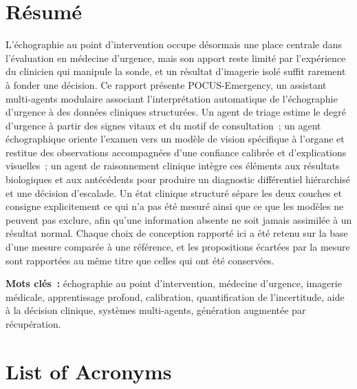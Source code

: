 \documentclass[11pt, a4paper]{article}
\begin{document}
\begin{sloppypar}
\section*{Résumé}
\noindent
L'échographie au point d'intervention occupe désormais une place centrale dans
l'évaluation en médecine d'urgence, mais son apport reste limité par l'expérience du
clinicien qui manipule la sonde, et un résultat d'imagerie isolé suffit rarement à fonder
une décision. Ce rapport présente POCUS-Emergency, un assistant multi-agents modulaire
associant l'interprétation automatique de l'échographie d'urgence à des données cliniques
structurées. Un agent de triage estime le degré d'urgence à partir des signes vitaux et du
motif de consultation~; un agent échographique oriente l'examen vers un modèle de vision
spécifique à l'organe et restitue des observations accompagnées d'une confiance calibrée
et d'explications visuelles~; un agent de raisonnement clinique intègre ces éléments aux
résultats biologiques et aux antécédents pour produire un diagnostic différentiel
hiérarchisé et une décision d'escalade. Un état clinique structuré sépare les deux couches
et consigne explicitement ce qui n'a pas été mesuré ainsi que ce que les modèles ne
peuvent pas exclure, afin qu'une information absente ne soit jamais assimilée à un
résultat normal. Chaque choix de conception rapporté ici a été retenu sur la base d'une
mesure comparée à une référence, et les propositions écartées par la mesure sont
rapportées au même titre que celles qui ont été conservées.

\vspace{0.4cm}
\noindent\textbf{Mots clés~:} échographie au point d'intervention, médecine d'urgence,
imagerie médicale, apprentissage profond, calibration, quantification de l'incertitude,
aide à la décision clinique, systèmes multi-agents, génération augmentée par récupération.

\newpage
\tableofcontents

\newpage
\listoffigures
{}
\listoftables
{}

\newpage
\section*{List of Acronyms}
\printacronymlist

\newpage
\setcounter{page}{1}
\pagestyle{plain}


\end{sloppypar}
\end{document}
